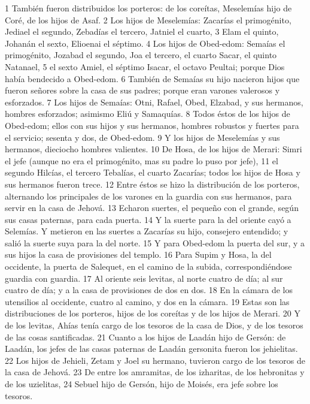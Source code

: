 1 También fueron distribuidos los porteros: de los coreítas, Meselemías hijo de Coré, de los hijos de Asaf.
2 Los hijos de Meselemías: Zacarías el primogénito, Jediael el segundo, Zebadías el tercero, Jatniel el cuarto,
3 Elam el quinto, Johanán el sexto, Elioenai el séptimo.
4 Los hijos de Obed-edom: Semaías el primogénito, Jozabad el segundo, Joa el tercero, el cuarto Sacar, el quinto Natanael,
5 el sexto Amiel, el séptimo Isacar, el octavo Peultai; porque Dios había bendecido a Obed-edom. 
6 También de Semaías su hijo nacieron hijos que fueron señores sobre la casa de sus padres; porque eran varones valerosos y esforzados.
7 Los hijos de Semaías: Otni, Rafael, Obed, Elzabad, y sus hermanos, hombres esforzados; asimismo Eliú y Samaquías.
8 Todos éstos de los hijos de Obed-edom; ellos con sus hijos y sus hermanos, hombres robustos y fuertes para el servicio; sesenta y dos, de Obed-edom.
9 Y los hijos de Meselemías y sus hermanos, dieciocho hombres valientes.
10 De Hosa, de los hijos de Merari: Simri el jefe (aunque no era el primogénito, mas su padre lo puso por jefe),
11 el segundo Hilcías, el tercero Tebalías, el cuarto Zacarías; todos los hijos de Hosa y sus hermanos fueron trece.
12 Entre éstos se hizo la distribución de los porteros, alternando los principales de los varones en la guardia con sus hermanos, para servir en la casa de Jehová.
13 Echaron suertes, el pequeño con el grande, según sus casas paternas, para cada puerta.
14 Y la suerte para la del oriente cayó a Selemías. Y metieron en las suertes a Zacarías su hijo, consejero entendido; y salió la suerte suya para la del norte.
15 Y para Obed-edom la puerta del sur, y a sus hijos la casa de provisiones del templo.
16 Para Supim y Hosa, la del occidente, la puerta de Salequet, en el camino de la subida, correspondiéndose guardia con guardia.
17 Al oriente seis levitas, al norte cuatro de día; al sur cuatro de día; y a la casa de provisiones de dos en dos.
18 En la cámara de los utensilios al occidente, cuatro al camino, y dos en la cámara.
19 Estas son las distribuciones de los porteros, hijos de los coreítas y de los hijos de Merari.
20 Y de los levitas, Ahías tenía cargo de los tesoros de la casa de Dios, y de los tesoros de las cosas santificadas.
21 Cuanto a los hijos de Laadán hijo de Gersón: de Laadán, los jefes de las casas paternas de Laadán gersonita fueron los jehielitas.
22 Los hijos de Jehieli, Zetam y Joel su hermano, tuvieron cargo de los tesoros de la casa de Jehová.
23 De entre los amramitas, de los izharitas, de los hebronitas y de los uzielitas,
24 Sebuel hijo de Gersón, hijo de Moisés, era jefe sobre los tesoros.
